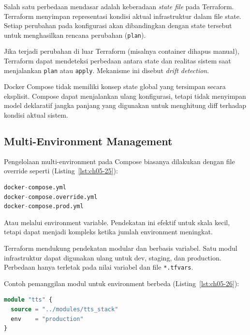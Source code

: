 Salah satu perbedaan mendasar adalah keberadaan \textit{state file} pada Terraform. Terraform menyimpan representasi kondisi aktual infrastruktur dalam file state. Setiap perubahan pada konfigurasi akan dibandingkan dengan state tersebut untuk menghasilkan rencana perubahan (\texttt{plan}).

Jika terjadi perubahan di luar Terraform (misalnya container dihapus manual), Terraform dapat mendeteksi perbedaan antara state dan realitas sistem saat menjalankan \texttt{plan} atau \texttt{apply}. Mekanisme ini disebut \textit{drift detection}.

Docker Compose tidak memiliki konsep state global yang tersimpan secara eksplisit. Compose dapat menjalankan ulang konfigurasi, tetapi tidak menyimpan model deklaratif jangka panjang yang digunakan untuk menghitung diff terhadap kondisi aktual sistem.

\subsection{Multi-Environment Management}

Pengelolaan multi-environment pada Compose biasanya dilakukan dengan file override seperti (Listing~\ref{lst:ch05-25}):

\begin{lstlisting}[language=terraform, caption={Potongan kode Terraform pada Multi-Environment Management}, label={lst:ch05-25}]
docker-compose.yml
docker-compose.override.yml
docker-compose.prod.yml
\end{lstlisting}

Atau melalui environment variable. Pendekatan ini efektif untuk skala kecil, tetapi dapat menjadi kompleks ketika jumlah environment meningkat.

Terraform mendukung pendekatan modular dan berbasis variabel. Satu modul infrastruktur dapat digunakan ulang untuk dev, staging, dan production. Perbedaan hanya terletak pada nilai variabel dan file \texttt{*.tfvars}.




Contoh pemanggilan modul untuk environment berbeda (Listing~\ref{lst:ch05-26}):

\begin{lstlisting}[language=terraform, caption={Potongan kode Terraform pada Multi-Environment Management (2)}, label={lst:ch05-26}]
module "tts" {
  source = "../modules/tts_stack"
  env    = "production"
}
\end{lstlisting}

